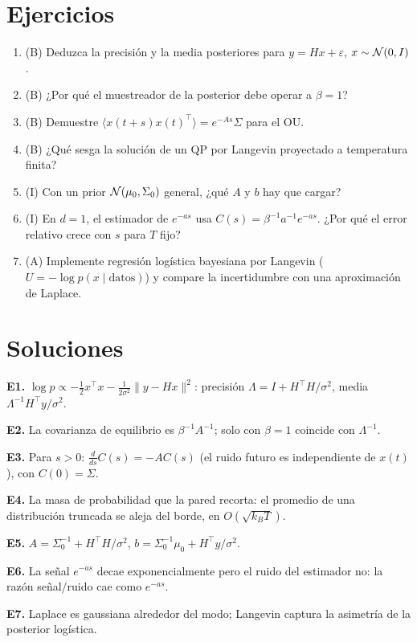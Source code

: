 \documentclass[11pt,a4paper]{article}
\begin{document}
\section{Ejercicios}
\begin{enumerate}[label=\textbf{E\arabic*.}]
\item (B) Deduzca la precisión y la media posteriores para $y=Hx+\varepsilon$, $x\sim\mathcal{N}(0,I)$.
\item (B) ¿Por qué el muestreador de la posterior debe operar a $\beta=1$?
\item (B) Demuestre $\langle x(t+s)x(t)^\top\rangle=e^{-As}\Sigma$ para el OU.
\item (B) ¿Qué sesga la solución de un QP por Langevin proyectado a temperatura finita?
\item (I) Con un prior $\mathcal{N}(\mu_0,\Sigma_0)$ general, ¿qué $A$ y $b$ hay que cargar?
\item (I) En $d=1$, el estimador de $e^{-as}$ usa $C(s)=\beta^{-1}a^{-1}e^{-as}$. ¿Por qué el error relativo crece con $s$ para $T$ fijo?
\item (A) Implemente regresión logística bayesiana por Langevin ($U=-\log p(x\mid\text{datos})$) y compare la incertidumbre con una aproximación de Laplace.
\end{enumerate}
\section{Soluciones}
\begin{solucion}
\textbf{E1.} $\log p\propto-\tfrac12x^\top x-\tfrac1{2\sigma^2}\|y-Hx\|^2$: precisión $\Lambda=I+H^\top H/\sigma^2$, media $\Lambda^{-1}H^\top y/\sigma^2$.

\textbf{E2.} La covarianza de equilibrio es $\beta^{-1}A^{-1}$; solo con $\beta=1$ coincide con $\Lambda^{-1}$.

\textbf{E3.} Para $s>0$: $\frac{d}{ds}C(s)=-AC(s)$ (el ruido futuro es independiente de $x(t)$), con $C(0)=\Sigma$.

\textbf{E4.} La masa de probabilidad que la pared recorta: el promedio de una distribución truncada se aleja del borde, en $O(\sqrt{k_BT})$.

\textbf{E5.} $A=\Sigma_0^{-1}+H^\top H/\sigma^2$, $b=\Sigma_0^{-1}\mu_0+H^\top y/\sigma^2$.

\textbf{E6.} La señal $e^{-as}$ decae exponencialmente pero el ruido del estimador no: la razón señal/ruido cae como $e^{-as}$.

\textbf{E7.} Laplace es gaussiana alrededor del modo; Langevin captura la asimetría de la posterior logística.
\end{solucion}
\end{document}
